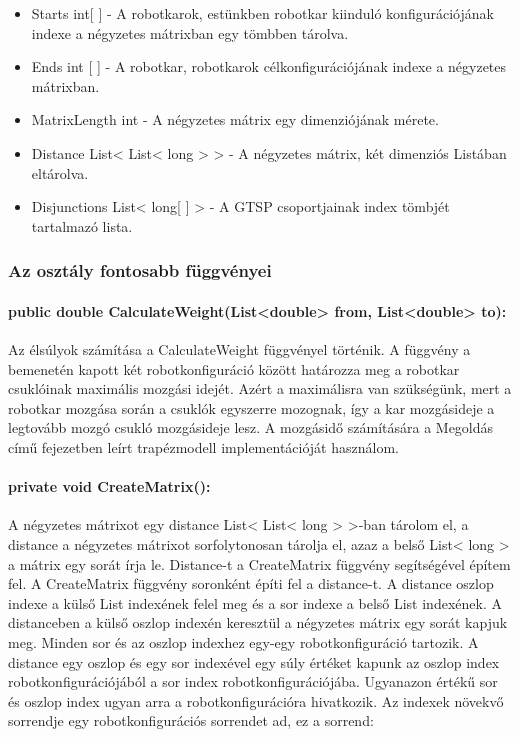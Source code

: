 \begin{itemize}
\item Starts int[ ] - A robotkarok, estünkben robotkar kiinduló konfigurációjának indexe a négyzetes mátrixban egy tömbben tárolva.
\item Ends int [ ] - A robotkar, robotkarok célkonfigurációjának indexe a négyzetes mátrixban. 
\item MatrixLength int - A négyzetes mátrix egy dimenziójának mérete.
\item Distance List< List< long > > - A négyzetes mátrix, két dimenziós Listában eltárolva.
\item Disjunctions List< long[ ] > - A GTSP csoportjainak index tömbjét tartalmazó lista.
\end{itemize}

\subsubsection*{Az osztály fontosabb függvényei}

\paragraph{public double CalculateWeight(List<double> from, List<double> to):}
Az élsúlyok számítása a CalculateWeight függvényel történik. A függvény a bemenetén kapott két robotkonfiguráció között határozza meg a robotkar csuklóinak maximális mozgási idejét. Azért a maximálisra van szükségünk, mert a robotkar mozgása során a csuklók egyszerre mozognak, így a kar mozgásideje a legtovább mozgó csukló mozgásideje lesz. A mozgásidő számítására a Megoldás című fejezetben leírt trapézmodell implementációját használom.


\paragraph{private void CreateMatrix():}
A négyzetes mátrixot egy distance List< List< long > >-ban tárolom el, a distance a négyzetes mátrixot sorfolytonosan tárolja el, azaz a belső List< long > a mátrix egy sorát írja le. Distance-t a CreateMatrix függvény segítségével építem fel. A CreateMatrix függvény soronként építi fel a distance-t. A distance oszlop indexe a külső List indexének felel meg és a sor indexe a belső List indexének. A distanceben a külső oszlop indexén keresztül a négyzetes mátrix egy sorát kapjuk meg.  Minden sor és az oszlop indexhez egy-egy robotkonfiguráció tartozik. A distance egy oszlop és egy sor indexével egy súly értéket kapunk az oszlop index robotkonfigurációjából a sor index robotkonfigurációjába. Ugyanazon értékű sor és oszlop index ugyan arra a robotkonfigurációra hivatkozik. Az indexek növekvő sorrendje egy robotkonfigurációs sorrendet ad,  ez a sorrend:

